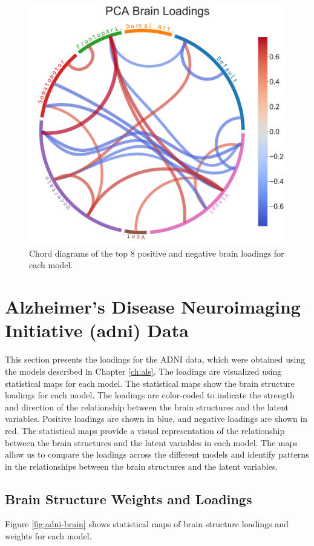 \begin{figure}
    \includegraphics[width=0.49\linewidth]{figures/hcp/PCA brain loadings}
    \caption{Chord diagrams of the top 8 positive and negative brain \gls{loadings} for each model.}\label{fig:chord_loadings}
\end{figure}

\newpage


\section{Alzheimer's Disease Neuroimaging Initiative (\acrshort{adni}) Data}

This section presents the loadings for the ADNI data, which were obtained using the models described in Chapter \ref{ch:als}. The loadings are visualized using statistical maps for each model. The statistical maps show the brain structure \gls{loadings} for each model. The loadings are color-coded to indicate the strength and direction of the relationship between the brain structures and the latent variables. Positive loadings are shown in blue, and negative loadings are shown in red. The statistical maps provide a visual representation of the relationship between the brain structures and the latent variables in each model. The maps allow us to compare the loadings across the different models and identify patterns in the relationships between the brain structures and the latent variables.

\subsection{Brain Structure Weights and Loadings}

Figure \ref{fig:adni-brain} shows statistical maps of brain structure \gls{loadings} and \gls{weights} for each model.

